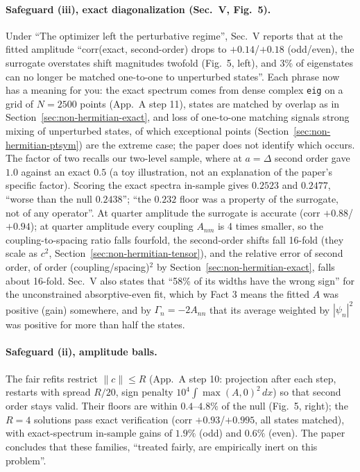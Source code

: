 \paragraph{Safeguard (iii), exact diagonalization (Sec.~V, Fig.~5).} Under ``The optimizer left the perturbative regime'', Sec.~V reports that at the fitted amplitude ``corr(exact, second-order) drops to $+0.14$/$+0.18$ (odd/even), the surrogate overstates shift magnitudes twofold (Fig.~5, left), and 3\% of eigenstates can no longer be matched one-to-one to unperturbed states''. Each phrase now has a meaning for you: the exact spectrum comes from dense complex \texttt{eig} on a grid of $N=2500$ points (App.~A step 11), states are matched by overlap as in Section~\ref{sec:non-hermitian-exact}, and loss of one-to-one matching signals strong mixing of unperturbed states, of which exceptional points (Section~\ref{sec:non-hermitian-ptsym}) are the extreme case; the paper does not identify which occurs. The factor of two recalls our two-level sample, where at $a=\Delta$ second order gave $1.0$ against an exact $0.5$ (a toy illustration, not an explanation of the paper's specific factor). Scoring the exact spectra in-sample gives $0.2523$ and $0.2477$, ``worse than the null $0.2438$''; ``the $0.232$ floor was a property of the surrogate, not of any operator''. At quarter amplitude the surrogate is accurate (corr $+0.88$/$+0.94$); at quarter amplitude every coupling $A_{nm}$ is 4 times smaller, so the coupling-to-spacing ratio falls fourfold, the second-order shifts fall 16-fold (they scale as $c^2$, Section~\ref{sec:non-hermitian-tensor}), and the relative error of second order, of order (coupling/spacing)$^2$ by Section~\ref{sec:non-hermitian-exact}, falls about 16-fold. Sec.~V also states that ``58\% of its widths have the wrong sign'' for the unconstrained absorptive-even fit, which by Fact 3 means the fitted $A$ was positive (gain) somewhere, and by $\Gamma_n=-2A_{nn}$ that its average weighted by $|\psi_n|^2$ was positive for more than half the states.

\paragraph{Safeguard (ii), amplitude balls.} The fair refits restrict $\lVert c\rVert\le R$ (App.~A step 10: projection after each step, restarts with spread $R/20$, sign penalty $10^4\int\max(A,0)^2\,dx$) so that second order stays valid. Their floors are within $0.4$--$4.8\%$ of the null (Fig.~5, right); the $R=4$ solutions pass exact verification (corr $+0.93$/$+0.995$, all states matched), with exact-spectrum in-sample gains of $1.9\%$ (odd) and $0.6\%$ (even). The paper concludes that these families, ``treated fairly, are empirically inert on this problem''.

